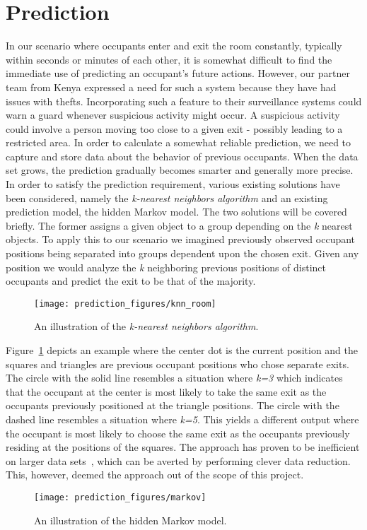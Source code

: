 \section{Prediction}
\label{sec:analysis_pred}
In our scenario where occupants enter and exit the room constantly, typically within seconds or minutes of each other, it is somewhat difficult to find the immediate use of predicting an occupant's future actions. However, our partner team from Kenya expressed a need for such a system because they have had issues with thefts. Incorporating such a feature to their surveillance systems could warn a guard whenever suspicious activity might occur. A suspicious activity could involve a person moving too close to a given exit - possibly leading to a restricted area. In order to calculate a somewhat reliable prediction, we need to capture and store data about the behavior of previous occupants. When the data set grows, the prediction gradually becomes smarter and generally more precise. In order to satisfy the prediction requirement, various existing solutions have been considered, namely the \emph{k-nearest neighbors algorithm} and an existing prediction model, the hidden Markov model. The two solutions will be covered briefly. The former assigns a given object to a group depending on the \emph{k} nearest objects. To apply this to our scenario we imagined previously observed occupant positions being separated into groups dependent upon the chosen exit. Given any position we would analyze the \emph{k} neighboring previous positions of distinct occupants and predict the exit to be that of the majority.
\begin{figure}
\centering
\texttt{[image: prediction\_figures/knn\_room]}
\caption{An illustration of the \emph{k-nearest neighbors algorithm}.}
\label{fig:knn}
\end{figure}
Figure~\ref{fig:knn} depicts an example where the center dot is the current position and the squares and triangles are previous occupant positions who chose separate exits. The circle with the solid line resembles a situation where \emph{k=3} which indicates that the occupant at the center is most likely to take the same exit as the occupants previously positioned at the triangle positions. The circle with the dashed line resembles a situation where \emph{k=5}. This yields a different output where the occupant is most likely to choose the same exit as the occupants previously residing at the positions of the squares. The approach has proven to be inefficient on larger data sets~\cite{bhatia}, which can be averted by performing clever data reduction. This, however, deemed the approach out of the scope of this project.
\begin{figure}
\centering
\texttt{[image: prediction\_figures/markov]}
\caption{An illustration of the hidden Markov model.}
\label{fig:markov}
\end{figure}

